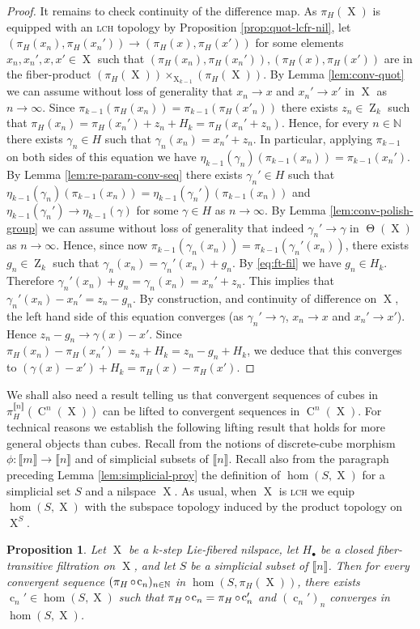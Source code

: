 \documentclass[a4paper,12pt,reqno]{amsart}
\newtheorem{proposition}[theorem]{Proposition}
\theoremstyle{definition}
\def\to{\rightarrow}
\newcommand*{\db}[1]{\llbracket #1\rrbracket}
\newcommand{\mb}{\mathbb}
\DeclareMathOperator{\ab}{Z}
\DeclareMathOperator{\tran}{\Theta}
\DeclareMathOperator{\q}{c}
\DeclareMathOperator{\ns}{X}
\DeclareMathOperator{\co}{\circ\hspace{-0.02 cm}}
\DeclareMathOperator{\cu}{C}
\begin{document}
\begin{proof}
It remains to check continuity of the difference map. As $\pi_H(\ns)$ is equipped with an \textsc{lch} topology by Proposition \ref{prop:quot-lcfr-nil}, let $(\pi_H(x_n),\pi_H(x_n')) \to (\pi_H(x),\pi_H(x'))$ for some elements $x_n,x_n',x,x'\in \ns$ such that $(\pi_H(x_n),\pi_H(x_n')),(\pi_H(x),\pi_H(x'))$ are in the fiber-product $(\pi_H(\ns))\times_{\ns_{k-1}}(\pi_H(\ns))$. By Lemma \ref{lem:conv-quot} we can assume without loss of generality that $x_n\to x$ and $x_n'\to x'$ in $\ns$ as $n\to\infty$. Since $\pi_{k-1}(\pi_H(x_n)) = \pi_{k-1}(\pi_H(x'_n))$ there exists $z_n\in \ab_k$ such that $\pi_H(x_n) = \pi_H(x_n')+z_n+H_k= \pi_H(x_n'+z_n)$. Hence, for every $n\in \mb{N}$ there exists $\gamma_n\in H$  such that $\gamma_n(x_n)=x_n'+z_n$. In particular, applying $\pi_{k-1}$ on both sides of this equation we have $\eta_{k-1}(\gamma_n)(\pi_{k-1}(x_n)) = \pi_{k-1}(x_n')$. By Lemma \ref{lem:re-param-conv-seq} there exists $\gamma_n'\in H$ such that $\eta_{k-1}(\gamma_n)(\pi_{k-1}(x_n)) = \eta_{k-1}(\gamma_n')(\pi_{k-1}(x_n))$ and $\eta_{k-1}(\gamma_n')\to \eta_{k-1}(\gamma)$ for some $\gamma\in H$ as $n\to\infty$. By Lemma \ref{lem:conv-polish-group} we can assume without loss of generality that indeed $\gamma_n'\to \gamma$ in $\tran(\ns)$ as $n\to\infty$. Hence, since now $\pi_{k-1}(\gamma_n(x_n)) = \pi_{k-1}(\gamma_n'(x_n))$, there exists $g_n\in \ab_k$ such that $\gamma_n(x_n) = \gamma_n'(x_n)+g_n$. By \eqref{eq:ft-fil} we have  $g_n\in H_k$. Therefore $\gamma_n'(x_n)+g_n = \gamma_n(x_n)=x_n'+z_n$. This implies that $\gamma_n'(x_n)-x_n' = z_n-g_n$. By construction, and continuity of difference on $\ns$, the left hand side of this equation converges (as $\gamma_n'\to \gamma$, $x_n\to x$ and $x_n'\to x'$). Hence $z_n-g_n\to \gamma(x)-x'$. Since $\pi_H(x_n)-\pi_H(x_n') = z_n+H_k = z_n-g_n+H_k$, we deduce that this converges to $(\gamma(x)-x')+H_k=\pi_H(x)-\pi_H(x')$.
\end{proof}
\noindent We shall also need a result telling us that convergent sequences of cubes in $\pi_H^{\db{n}}(\cu^n(\ns))$ can be lifted to convergent sequences in $\cu^n(\ns)$. For technical reasons we establish the following lifting result that holds for more general objects than cubes. Recall from \cite{Cand:Notes1} the notions of discrete-cube morphism $\phi:\db{m}\to\db{n}$ and of simplicial subsets of $\db{n}$. Recall also from the paragraph preceding Lemma \ref{lem:simplicial-proy} the definition of $\hom(S,\ns)$ for a simplicial set $S$ and a nilspace $\ns$. As usual, when $\ns$ is \textsc{lch} we equip $\hom(S,\ns)$ with the subspace topology induced by the product topology on $\ns^S$.
\begin{proposition}\label{prop:lift-of-simplicial}
Let $\ns$ be a $k$-step Lie-fibered nilspace, let $H_\bullet$ be a closed fiber-transitive filtration on $\ns$, and let $S$ be a simplicial subset of $\db{n}$. Then for every convergent sequence $(\pi_H\co\q_n)_{n\in\mb{N}}$ in $\hom(S,\pi_H(\ns))$,  there exists $\q_n'\in \hom(S,\ns)$ such that $\pi_H\co\q_n=\pi_H\co \q_n'$ and $(\q_n')_n$ converges in $\hom(S,\ns)$.
\end{proposition}
\end{document}
